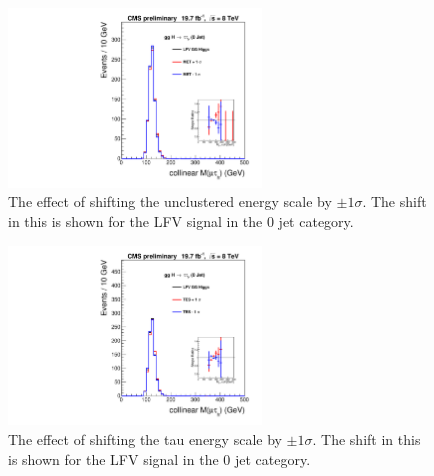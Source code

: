 \documentclass[oneside, letterpaper, oldfontcommands]{memoir}
\begin{document}
\begin{figure}[hbtp]\centering
\includegraphics[width=0.6\textwidth]{UES_Shift_8TeV.pdf}

\caption{The effect of shifting the unclustered energy scale by $\pm 1 \sigma$. The shift in this is shown for the LFV signal in the 0 jet category.} 
\label{fig:uesshift}\end{figure}

\begin{figure}[hbtp]\centering
\includegraphics[width=0.6\textwidth]{TES_Shift_8TeV.pdf}

\caption{The effect of shifting the tau energy scale by $\pm 1 \sigma$. The shift in this is shown for the LFV signal in the 0 jet category.} 
\label{fig:tesshift}\end{figure}
\end{document}
